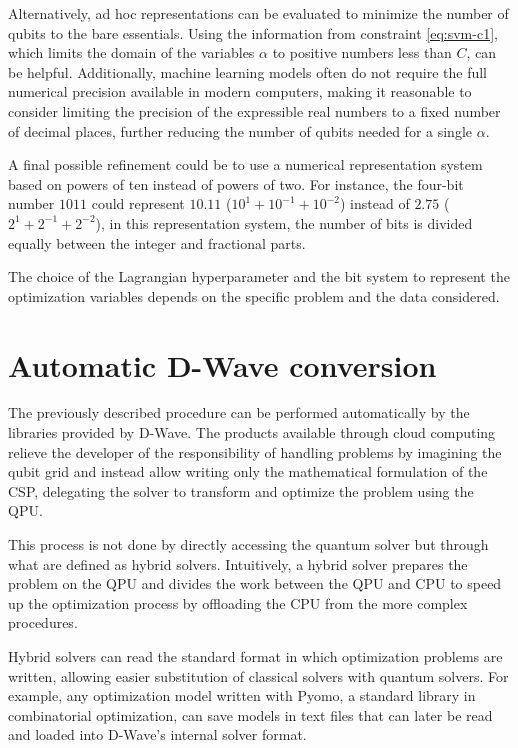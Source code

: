 Alternatively, ad hoc representations can be evaluated to minimize the number of qubits to the bare essentials. Using the information from constraint \ref{eq:svm-c1}, which limits the domain of the variables $\alpha$ to positive numbers less than $C$, can be helpful. Additionally, machine learning models often do not require the full numerical precision available in modern computers, making it reasonable to consider limiting the precision of the expressible real numbers to a fixed number of decimal places, further reducing the number of qubits needed for a single $\alpha$.

A final possible refinement could be to use a numerical representation system based on powers of ten instead of powers of two. For instance, the four-bit number $1011$ could represent $10.11$ ($10^1 + 10^{-1} + 10^{-2}$) instead of $2.75$ ($2^1 + 2^{-1} + 2^{-2}$), in this representation system, the number of bits is divided equally between the integer and fractional parts.

The choice of the Lagrangian hyperparameter and the bit system to represent the optimization variables depends on the specific problem and the data considered.

\section{Automatic D-Wave conversion}\label{sec:dwaveconversion}

The previously described procedure can be performed automatically by the libraries provided by D-Wave. The products available through cloud computing relieve the developer of the responsibility of handling problems by imagining the qubit grid and instead allow writing only the mathematical formulation of the CSP, delegating the solver to transform and optimize the problem using the QPU.

This process is not done by directly accessing the quantum solver but through what are defined as hybrid solvers\cite{hybrid}. Intuitively, a hybrid solver prepares the problem on the QPU and divides the work between the QPU and CPU to speed up the optimization process by offloading the CPU from the more complex procedures.

Hybrid solvers can read the standard format in which optimization problems are written, allowing easier substitution of classical solvers with quantum solvers. For example, any optimization model written with Pyomo\cite{pyomo}, a standard library in combinatorial optimization, can save models in text files that can later be read and loaded into D-Wave’s internal solver format.

